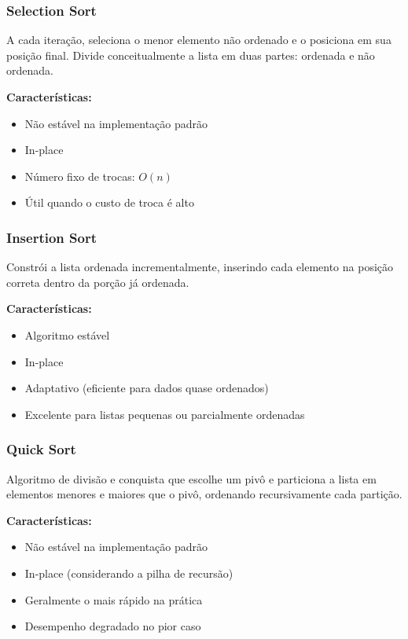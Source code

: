 \documentclass[conference]{IEEEtran}
\begin{document}
\subsubsection{Selection Sort}

A cada iteração, seleciona o menor elemento não ordenado e o posiciona em sua posição final. Divide conceitualmente a lista em duas partes: ordenada e não ordenada.

\textbf{Características:}
\begin{itemize}
    \item Não estável na implementação padrão
    \item In-place
    \item Número fixo de trocas: $O(n)$
    \item Útil quando o custo de troca é alto
\end{itemize}

\subsubsection{Insertion Sort}

Constrói a lista ordenada incrementalmente, inserindo cada elemento na posição correta dentro da porção já ordenada.

\textbf{Características:}
\begin{itemize}
    \item Algoritmo estável
    \item In-place
    \item Adaptativo (eficiente para dados quase ordenados)
    \item Excelente para listas pequenas ou parcialmente ordenadas
\end{itemize}

\subsubsection{Quick Sort}

Algoritmo de divisão e conquista que escolhe um pivô e particiona a lista em elementos menores e maiores que o pivô, ordenando recursivamente cada partição.

\textbf{Características:}
\begin{itemize}
    \item Não estável na implementação padrão
    \item In-place (considerando a pilha de recursão)
    \item Geralmente o mais rápido na prática
    \item Desempenho degradado no pior caso
\end{itemize}
\end{document}
